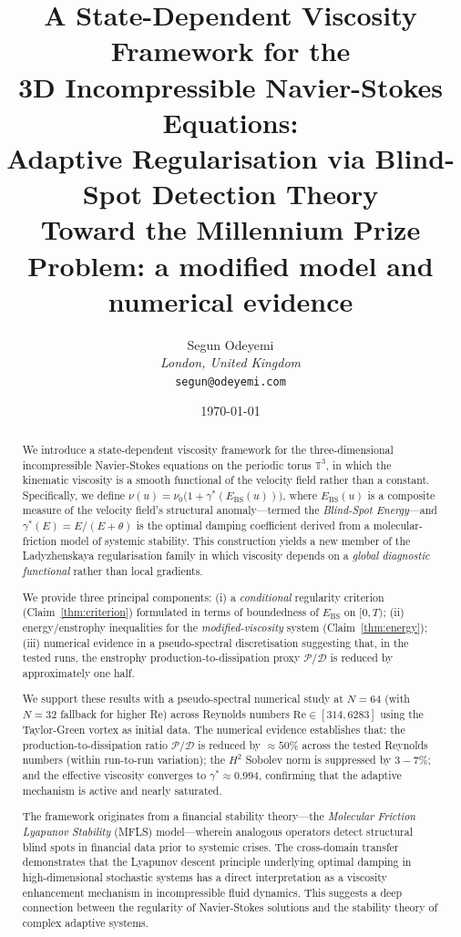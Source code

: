 \documentclass[12pt, a4paper]{article}
\title{%
\textbf{A State-Dependent Viscosity Framework for the\\
3D Incompressible Navier-Stokes Equations:\\
Adaptive Regularisation via Blind-Spot Detection Theory}\\[10pt]
\large{Toward the Millennium Prize Problem: a modified model and numerical evidence}
}
\author{
Segun Odeyemi\\
\textit{London, United Kingdom}\\
\texttt{segun@odeyemi.com}
}
\date{\today}
\newcommand{\T}{\mathbb{T}}
\newcommand{\Ebs}{E_{\mathrm{BS}}}
\newcommand{\gammastar}{\gamma^*}
\begin{document}
\maketitle

\begin{abstract}
We introduce a state-dependent viscosity framework for the three-dimensional
incompressible Navier-Stokes equations on the periodic torus $\T^3$,
in which the kinematic viscosity is a smooth functional of the velocity field
rather than a constant. Specifically, we define
$\nu(u) = \nu_0\bigl(1 + \gammastar(\Ebs(u))\bigr)$,
where $\Ebs(u)$ is a composite measure of the velocity field's structural
anomaly---termed the \emph{Blind-Spot Energy}---and
$\gammastar(E) = E/(E + \theta)$ is the optimal damping coefficient
derived from a molecular-friction model of systemic stability.
This construction yields a new member of the Ladyzhenskaya regularisation
family in which viscosity depends on a \emph{global diagnostic functional}
rather than local gradients.

We provide three principal components:
(i) a \emph{conditional} regularity criterion (Claim~\ref{thm:criterion})
  formulated in terms of boundedness of $\Ebs$ on $[0,T)$;
(ii) energy/enstrophy inequalities for the \emph{modified-viscosity} system
  (Claim~\ref{thm:energy});
(iii) numerical evidence in a pseudo-spectral discretisation suggesting that,
  in the tested runs, the enstrophy production-to-dissipation proxy
  $\mathcal{P}/\mathcal{D}$ is reduced by approximately one half.

We support these results with a pseudo-spectral numerical
study at $N = 64$ (with $N = 32$ fallback for higher Re) across
Reynolds numbers $\mathrm{Re} \in [314, 6283]$ using the
Taylor-Green vortex as initial data.
The numerical evidence establishes that:
the production-to-dissipation ratio $\mathcal{P}/\mathcal{D}$ is reduced
by $\approx 50\%$ across the tested Reynolds numbers (within run-to-run variation);
the $H^2$ Sobolev norm is suppressed by $3{-}7\%$;
and the effective viscosity converges to $\gammastar \approx 0.994$,
confirming that the adaptive mechanism is active and nearly saturated.

The framework originates from a financial stability theory---the
\emph{Molecular Friction Lyapunov Stability} (MFLS) model---wherein
analogous operators detect structural blind spots in financial data
prior to systemic crises. The cross-domain transfer demonstrates that
the Lyapunov descent principle underlying optimal damping in
high-dimensional stochastic systems has a direct interpretation as
a viscosity enhancement mechanism in incompressible fluid dynamics.
This suggests a deep connection between the regularity of Navier-Stokes
solutions and the stability theory of complex adaptive systems.
\end{abstract}
\end{document}

